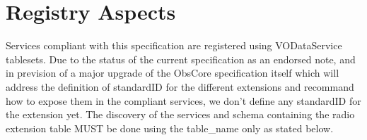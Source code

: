 \documentclass[11pt,a4paper]{ivoa}
\begin{document}
%
%
%
%
%

\section{Registry Aspects}
\label{sec:registry}

Services compliant with this specification are registered using
VODataService \citep{2021ivoa.spec.1102D} tablesets. 
Due to the status of the current specification as an endorsed note, and in prevision of a major 
upgrade of the ObsCore specification itself which will address the definition of standardID for the 
different extensions and recommand how to expose them in the compliant services, we don't define
any standardID for the extension yet. The discovery of the services and schema containing the
radio extension  table MUST be done using the table\_name only as stated below.
\end{document}

